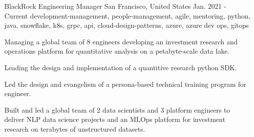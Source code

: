 \cventry
    {BlackRock} %
    {Engineering Manager} %
    {San Francisco, United States} %
    {Jan. 2021 - Current} %
    { development-management, people-management, agile, mentoring, python, java, snowflake, k8s, grpc, api, cloud-design-patterns, azure, azure dev ops, gitops} %
    {
    \begin{cvitems} %
       \item { Managing a global team of 8 engineers developing an investment research and operations platform for quantitative analysis on a petabyte-scale data lake. }
       \item { Leading the design and implementation of a quantitive research python SDK. }
       \item { Led the design and evangelism of a persona-based technical training program for engineer. }
       \item { Built and led a global team of 2 data scientists and 3 platform engineers to deliver NLP data science projects and an MLOps platform for investment research on terabytes of unstructured datasets. }
    \end{cvitems}
    }
